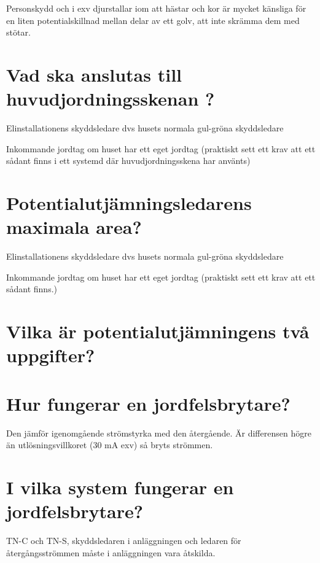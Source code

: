 \documentclass[a4paper,swedish]{article}
\begin{document}
Personskydd och i exv djurstallar iom att hästar och kor är mycket känsliga för en liten potentialskillnad
mellan delar av ett golv, att inte skrämma dem med stötar.

\setcounter{section}{21}
\section{Vad ska anslutas till huvudjordningsskenan ?}\label{sec:huvudjordningsskenan}

Elinstallationens skyddsledare dvs husets normala gul-gröna skyddsledare

Inkommande jordtag om huset har ett eget jordtag (praktiskt sett ett krav att ett sådant finns i ett systemd där huvudjordningsskena har använts)

\setcounter{section}{23}
\section{Potentialutjämningsledarens maximala area?}\label{sec:potentialutjamningarea}

Elinstallationens skyddsledare dvs husets normala gul-gröna skyddsledare

Inkommande jordtag om huset har ett eget jordtag (praktiskt sett ett krav att ett sådant finns.)

\setcounter{section}{25}
\section{Vilka är potentialutjämningens två uppgifter?}\label{sec:potentialutjamningsuppgifter}

\setcounter{section}{27}
\section{Hur fungerar en jordfelsbrytare?}\label{sec:RCD_working}

Den jämför igenomgående strömstyrka med den återgående. Är differensen högre än utlösningsvillkoret
(30 mA exv) så bryts strömmen.

\setcounter{section}{29}
\section{I vilka system fungerar en jordfelsbrytare?}\label{sec:RCD_systems}

TN-C och TN-S, skyddsledaren i anläggningen och ledaren för återgångsströmmen måste i anläggningen vara åtskilda.
\end{document}
